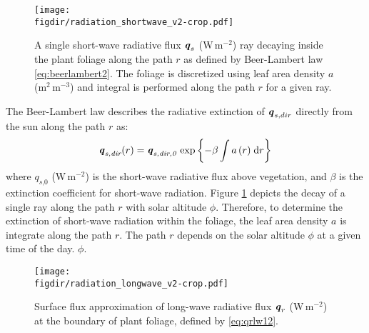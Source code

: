 \begin{figure}[t]
	\centering
	\texttt{[image: \\figdir/radiation\_shortwave\_v2-crop.pdf]}
	\caption{A single short-wave radiative flux $\textbf{\textit{q}}_s$ (W\,m$^{-2}$) ray decaying inside the plant foliage along the path $r$ as defined by Beer-Lambert law  \cref{eq:beerlambert2}. The foliage is discretized using leaf area density $a$ (m$^2$\,m$^{-3}$) and integral is performed along the path $r$ for a given ray.}
	\label{fig:radiation_shortwave}
\end{figure}


The Beer-Lambert law describes the radiative extinction of $\textbf{\textit{q}}_{s,dir}$ directly from the sun along the path $r$ as:
\begin{equation}
\textbf{\textit{q}}_{\textit{s,dir}}(r) = \textbf{\textit{q}}_{\textit{s,dir,0}}\,\exp\left\{ - \beta \int{a\left( r \right)} \;\mathrm{d}r \right\}
\label{eq:beerlambert2}
\end{equation}
where $q_{\textit{s,0}}$ (W\,m$^{-2}$) is the short-wave radiative flux above vegetation, and $\beta$ is the extinction coefficient for short-wave radiation. Figure \cref{fig:radiation_shortwave} depicts the decay of a single ray along the path $r$ with solar altitude $\phi$. Therefore, to determine the extinction of short-wave radiation within the foliage, the leaf area density $a$ is integrate along the path $r$. The path $r$ depends on the solar altitude $\phi$ at a given time of the day.  $\phi$.

	\begin{figure}[t]
		\centering
		\texttt{[image: \\figdir/radiation\_longwave\_v2-crop.pdf]}
		\caption{Surface flux approximation of long-wave radiative flux $\textbf{\textit{q}}_r$ (W\,m$^{-2}$) at the boundary of plant foliage, defined by \cref{eq:qrlw12}.}
		\label{fig:radiation_longwave}
	\end{figure}

